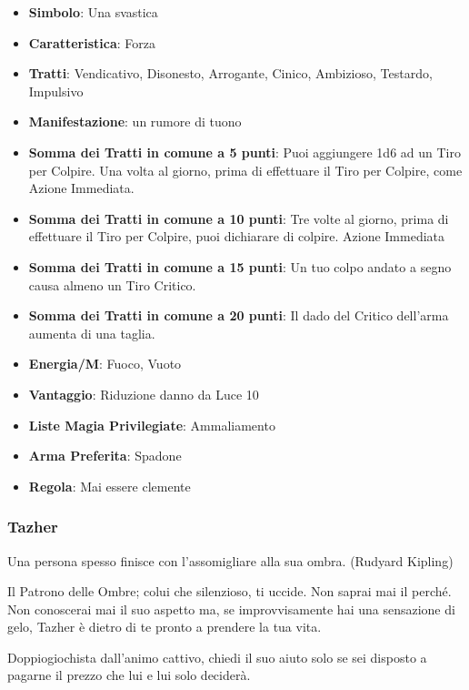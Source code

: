 \begin{multicols}{2}
\begin{itemize}[leftmargin=*] \setlength{\itemsep}{0pt}
\item \textbf{Simbolo}: Una svastica
\item \textbf{Caratteristica}: Forza
\item \textbf{Tratti}: Vendicativo, Disonesto, Arrogante, Cinico, Ambizioso, Testardo, Impulsivo
\item \textbf{Manifestazione}: un rumore di tuono
\item \textbf{Somma dei Tratti in comune a 5 punti}: Puoi aggiungere 1d6 ad un Tiro per Colpire. Una volta al giorno, prima di effettuare il Tiro per Colpire, come Azione Immediata.
\item \textbf{Somma dei Tratti in comune a 10 punti}: Tre volte al giorno, prima di effettuare il Tiro per Colpire, puoi dichiarare di colpire. Azione Immediata
\item \textbf{Somma dei Tratti in comune a 15 punti}: Un tuo colpo andato a segno causa almeno un Tiro Critico.
\item \textbf{Somma dei Tratti in comune a 20 punti}: Il dado del Critico dell'arma aumenta di una taglia.
\item \textbf{Energia/M}: Fuoco, Vuoto
\item \textbf{Vantaggio}: Riduzione danno da Luce 10
\item \textbf{Liste Magia Privilegiate}: Ammaliamento
\item \textbf{Arma Preferita}: Spadone
\item \textbf{Regola}: Mai essere clemente
\end{itemize}

\subsubsection{Tazher}\label{tazher}\hypertarget{tazher}{}

\begin{enfasi}{
Una persona spesso finisce con l'assomigliare alla sua ombra. (Rudyard Kipling)
}\end{enfasi}

Il Patrono delle Ombre; colui che silenzioso, ti uccide. Non saprai mai il perché. Non conoscerai mai il suo aspetto ma, se improvvisamente hai una sensazione di gelo, Tazher è dietro di te pronto a prendere la tua vita.

Doppiogiochista dall'animo cattivo, chiedi il suo aiuto solo se sei disposto a pagarne il prezzo che lui e lui solo deciderà.


\end{multicols}
